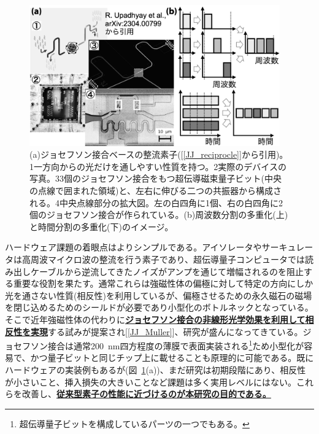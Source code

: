 \documentclass[11pt,a4j,dvipdfmx]{jarticle} 					%
\newcommand{\研究課題名}{誤り耐性量子コンピュータに向けた誤り訂正技術の開発(仮)}
\newcommand{\研究機関名}{東京大学}
\newcommand{\研究代表者氏名}{寺師弘二}
\newcommand{\研究期間の最終元号年度}{10}  %
\newcommand{\mybf}[1]{{\bfseries\sffamily#1}}
\newcommand{\maruone}{\raise0.2mm\hbox{\textcircled{\scriptsize{1}}}}
\newcommand{\marutwo}{\raise0.2mm\hbox{\textcircled{\scriptsize{2}}}}
\newcommand{\maruthree}{\raise0.2mm\hbox{\textcircled{\scriptsize{3}}}}
\newcommand{\marufour}{\raise0.2mm\hbox{\textcircled{\scriptsize{4}}}}
\begin{document}
\begin{figure}
	\begin{center}
		\vspace{-1.2cm}
		\includegraphics[width=10.8cm]{figs/hard.png}\vspace{-0.4cm}
		\caption{\small{(a)ジョセフソン接合ベースの整流素子([\ref{JJ_reciprocle}]から引用)。\maruone 一方向からの光だけを通しやすい性質を持つ。\marutwo 実際のデバイスの写真。\maruthree 3個のジョセフソン接合をもつ超伝導磁束量子ビット(中央の点線で囲まれた領域)と、左右に伸びる二つの共振器から構成される。\marufour 中央点線部分の拡大図。左の白四角に1個、右の白四角に2個のジョセフソン接合が作られている。(b)周波数分割の多重化(上)と時間分割の多重化(下)のイメージ。}
		\label{fig:hard}}\vspace{-0.7cm}
	\end{center}
\end{figure}

ハードウェア課題の着眼点はよりシンプルである。アイソレータやサーキュレータは高周波マイクロ波の整流を行う素子であり、超伝導量子コンピュータでは読み出しケーブルから逆流してきたノイズがアンプを通じて増幅されるのを阻止する重要な役割を果たす。通常これらは強磁性体の偏極に対して特定の方向にしか光を通さない性質(相反性)を利用しているが、偏極させるための永久磁石の磁場を閉じ込めるためのシールドが必要であり小型化のボトルネックとなっている。そこで近年強磁性体の代わりに\mybf{\ul{ジョセフソン接合の非線形光学効果を利用して相反性を実現}}する試みが提案され[\ref{JJ_Muller}]、研究が盛んになってきている。ジョセフソン接合は通常200~{nm}四方程度の薄膜で表面実装される\footnote{超伝導量子ビットを構成しているパーツの一つでもある。}ため小型化が容易で、かつ量子ビットと同じチップ上に載せることも原理的に可能である。既にハードウェアの実装例もあるが(図~\ref{fig:hard}(a))、まだ研究は初期段階にあり、相反性が小さいこと、挿入損失の大きいことなど課題は多く実用レベルにはない。これらを改善し、\mybf{\ul{従来型素子の性能に近づけるのが本研究の目的である。}}
\end{document}
